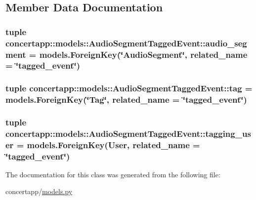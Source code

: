 \subsection{Member Data Documentation}
\hypertarget{classconcertapp_1_1models_1_1_audio_segment_tagged_event_acb8c377922a19775d4440defd98b6097}{
\subsubsection[{audio\_\-segment}]{\setlength{\rightskip}{0pt plus 5cm}tuple {\bf concertapp::models::AudioSegmentTaggedEvent::audio\_\-segment} = models.ForeignKey(\char`\"{}AudioSegment\char`\"{}, related\_\-name = \char`\"{}tagged\_\-event\char`\"{})}}
\label{classconcertapp_1_1models_1_1_audio_segment_tagged_event_acb8c377922a19775d4440defd98b6097}
\hypertarget{classconcertapp_1_1models_1_1_audio_segment_tagged_event_a54194571bbcf25ed56ae63b532881ba3}{
\subsubsection[{tag}]{\setlength{\rightskip}{0pt plus 5cm}tuple {\bf concertapp::models::AudioSegmentTaggedEvent::tag} = models.ForeignKey(\char`\"{}Tag\char`\"{}, related\_\-name = \char`\"{}tagged\_\-event\char`\"{})}}
\label{classconcertapp_1_1models_1_1_audio_segment_tagged_event_a54194571bbcf25ed56ae63b532881ba3}
\hypertarget{classconcertapp_1_1models_1_1_audio_segment_tagged_event_a3172b21716d3ebaf659246b197558de2}{
\subsubsection[{tagging\_\-user}]{\setlength{\rightskip}{0pt plus 5cm}tuple {\bf concertapp::models::AudioSegmentTaggedEvent::tagging\_\-user} = models.ForeignKey(User, related\_\-name = \char`\"{}tagged\_\-event\char`\"{})}}
\label{classconcertapp_1_1models_1_1_audio_segment_tagged_event_a3172b21716d3ebaf659246b197558de2}


The documentation for this class was generated from the following file:\begin{DoxyCompactItemize}
\item 
concertapp/\hyperlink{models_8py}{models.py}\end{DoxyCompactItemize}
